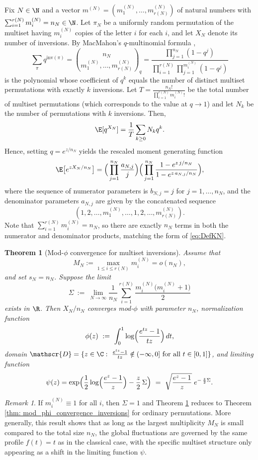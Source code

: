 \documentclass[11pt,a4paper]{scrartcl}
\numberwithin{equation}{section}
\theoremstyle{plain}
\newtheorem{theorem}{Theorem}[section]
\theoremstyle{definition}
\theoremstyle{remark}
\newtheorem{remark}{Remark}[section]
\begin{document}
Fix $N\in\N$ and a vector  $m^{(N)}=(m_1^{(N)},\dots,m_{r(N)}^{(N)})$ of natural numbers with $\sum_{i=1}^{r(N)} m_i^{(N)}=n_N \in\N$. Let $\pi_N$ be a uniformly random permutation of the multiset having $m_i^{(N)}$ copies of the letter $i$ for each $i$, and let $X_N$ denote its number of inversions. By MacMahon's $q$-multinomial formula \cite[Equations (2) and (3)]{novick2009bijective},
\[
\sum_{\pi} q^{\mathrm{inv}(\pi)}=\binom{n_N}{m_1^{(N)},\dots,m_{r(N)}^{(N)}}_{q}
=\frac{\prod_{j=1}^{n_N}(1-q^{j})}{\prod_{i=1}^{r(N)}\prod_{j=1}^{m_i^{(N)}}(1-q^{j})}
\]
is the polynomial whose coefficient of $q^k$ equals the number of distinct multiset permutations with exactly $k$ inversions. Let $T = \frac{n_N!}{\prod_{i=1}^{r(N)} m_i^{(N)}!}$ be the total number of multiset permutations (which corresponds to the value at $q\to 1$) and let $N_k$ be the number of permutations with $k$ inversions. Then,
$$
\E[q^{X_N}] = \frac{1}{T}\sum_{k\ge 0} N_k q^k.
$$
Hence, setting $q=e^{z/n_N}$ yields the rescaled moment generating function
\[
\E\big[e^{z X_N/n_N}\big] = \Big(\prod_{j=1}^{n_N}\frac{a_{N,j}}{j}\Big)\Big(\prod_{j=1}^{n_N}\frac{1-e^{z\,j/n_N}}{1-e^{z\,a_{N,j}/n_N}}\Big), \] where the sequence of numerator parameters is $b_{N,j}=j$ for $j=1,\ldots,n_N$, and the denominator parameters $a_{N,j}$ are given by the concatenated sequence \[ (1,2,\dots,m_1^{(N)}, \dots, 1,2,\dots,m_{r(N)}^{(N)}). \] Note that $\sum_{i=1}^{r(N)} m_i^{(N)} = n_N$, so there are exactly $n_N$ terms in both the numerator and denominator products, matching the form of \eqref{eq:DefKN}.

\begin{theorem}[Mod-$\phi$ convergence for multiset inversions]\label{thm:modphi-multiset-inversions}
Assume that 
$$
M_N:=\max_{1\le i\le r(N)} m_i^{(N)} =  o(n_N),
$$
and set $s_N=n_N$. Suppose the limit
\[
\Sigma\ :=\ \lim_{N\to\infty}\frac{1}{n_N}\sum_{i=1}^{r(N)}\frac{m_i^{(N)}\bigl(m_i^{(N)}+1\bigr)}{2}
\]
exists in $\R$. Then $X_N/n_N$ converges mod-$\phi$ with parameter $n_N$, normalization function
\[
\phi(z)\ :=\ \int_0^1 \log\Bigl(\frac{e^{tz}-1}{tz}\Bigr)\,dt,
\]
domain $\mathscr{D}=\{z\in\C:\ \frac{e^{tz}-1}{tz}\notin(-\infty,0]\ \text{for all }t\in[0,1]\}$, and limiting function
\[
\psi(z) = \exp\Bigl(\frac12\log\Bigl(\frac{e^{z}-1}{z}\Bigr)-\frac{z}{2}\,\Sigma\Bigr)
\ =\ \sqrt{\frac{e^{z}-1}{z}}\;e^{-\,\frac{z}{2}\Sigma}.
\]
\end{theorem}

\begin{remark}
	If $m_i^{(N)}\equiv 1$ for all $i$, then $\Sigma=1$ and Theorem \ref{thm:modphi-multiset-inversions} reduces to Theorem \ref{thm: mod_phi_convergence_inversions} for ordinary permutations. More generally, this result shows that as long as the largest multiplicity $M_N$ is small compared to the total size $n_N$, the global fluctuations are governed by the same profile $f(t)=t$ as in the classical case, with the specific multiset structure only appearing as a shift in the limiting function $\psi$.
\end{remark}
\end{document}
